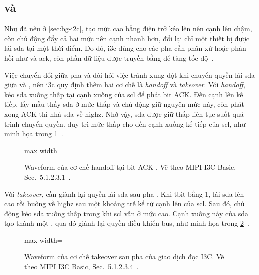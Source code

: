\subsection{\OpenDrain{} và \PushPull{}}
\label{sec:bg-odpp}

Như đã nêu ở \cref{sec:bg-i2c}, \OpenDrain{} tạo mức cao bằng điện trở
kéo lên nên cạnh lên chậm, còn \PushPull{} chủ động đẩy cả hai mức nên
cạnh nhanh hơn, đổi lại chỉ một thiết bị được lái \gls{sda} tại một thời điểm.
Do đó, \gls{i3c} dùng \OpenDrain{} cho các pha cần phân xử hoặc phản hồi như
\AddressHeader{} và \gls{ack}, còn phần dữ liệu được truyền bằng \PushPull{}
để tăng tốc độ~\cite{mipi_i3c_basic}.

Việc chuyển đổi giữa pha \OpenDrain{} và \PushPull{} đòi hỏi việc tránh xung đột khi chuyển
quyền lái \gls{sda} giữa \Target{} và \Controller{},
nên \gls{i3c} quy định thêm hai cơ chế là \emph{handoff} và \emph{takeover}. Với
\emph{handoff}, \Target{} kéo \gls{sda} xuống thấp tại cạnh xuống của \gls{scl} để
phát bit ACK. Đến cạnh lên kế tiếp, \Controller{} lấy mẫu thấy \gls{sda} ở mức
thấp và chủ động giữ nguyên mức này, còn \Target{} phát xong ACK thì nhả
\gls{sda} về \gls{highz}. Nhờ vậy, \gls{sda} được giữ thấp liên tục suốt quá trình chuyển
quyền. \Controller{} duy trì mức thấp cho đến cạnh xuống kế tiếp của \gls{scl},
như minh họa trong \cref{fig:low-handoff-timing}~\cite{mipi_i3c_basic}.

\begin{figure}[!htbp]
	\centering
	\begin{adjustbox}{max width=\textwidth}
		
	\end{adjustbox}
	\caption[Waveform handoff tại bit ACK Open-Drain]{Waveform của cơ chế handoff tại bit ACK \OpenDrain{}. Vẽ theo MIPI I3C Basic, Sec.~5.1.2.3.1~\cite{mipi_i3c_basic}.}
	\label{fig:low-handoff-timing}
\end{figure}

Với \emph{takeover}, \Controller{} cần giành lại quyền lái \gls{sda} sau pha
\PushPull{}. Khi \gls{tbit} bằng 1, \Target{} lái \gls{sda} lên
cao rồi buông về \gls{highz} sau một khoảng trễ kể từ cạnh lên của
\gls{scl}. Sau đó, \Controller{} chủ động kéo \gls{sda} xuống thấp trong khi \gls{scl} vẫn ở mức cao. Cạnh xuống này của
\gls{sda} tạo thành một \RepeatedSTART{}, qua đó \Controller{} giành lại quyền
điều khiển bus, như minh họa trong \cref{fig:read-takeover-timing}~\cite{mipi_i3c_basic}.

\begin{figure}[!htbp]
	\centering
	\begin{adjustbox}{max width=\textwidth}
		
	\end{adjustbox}
	\caption[Waveform takeover của giao dịch đọc I3C]{Waveform của cơ chế takeover sau pha \PushPull{} của giao dịch đọc I3C. Vẽ theo MIPI I3C Basic, Sec.~5.1.2.3.4~\cite{mipi_i3c_basic}.}
	\label{fig:read-takeover-timing}
\end{figure}

